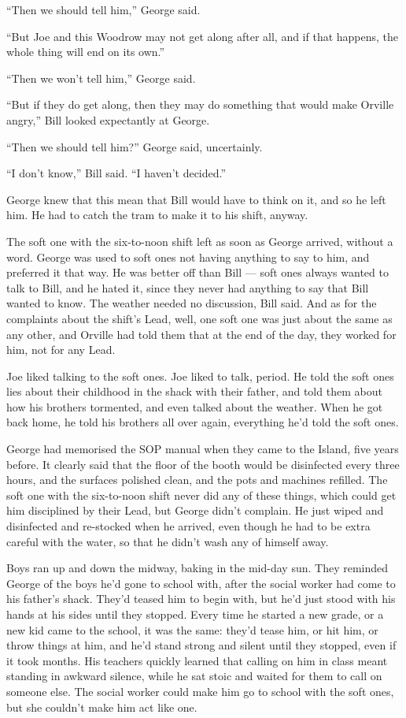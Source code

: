 ``Then we should tell him,'' George said.

``But Joe and this Woodrow may not get along after all, and if that happens, 
the whole thing will end on its own.''

``Then we won't tell him,'' George said.

``But if they do get along, then they may do something that would make Orville 
angry,''
Bill looked expectantly at George.

``Then we should tell him?'' George said, uncertainly.

``I don't know,'' Bill said. ``I haven't decided.''

George knew that this mean that Bill would have to think on it, and
so he left him. He had to catch the tram to make it to his shift,
anyway.

\tb

The soft one with the six-to-noon shift left as soon as George
arrived, without a word. George was used to soft ones not having
anything to say to him, and preferred it that way. He was better
off than Bill --- soft ones always wanted to talk to Bill, and he
hated it, since they never had anything to say that Bill wanted to
know. The weather needed no discussion, Bill said. And as for the
complaints about the shift's Lead, well, one soft one was just
about the same as any other, and Orville had told them that at the
end of the day, they worked for him, not for any Lead.

Joe liked talking to the soft ones. Joe liked to talk, period. He
told the soft ones lies about their childhood in the shack with
their father, and told them about how his brothers tormented, and
even talked about the weather. When he got back home, he told his
brothers all over again, everything he'd told the soft ones.

George had memorised the SOP manual when they came to the Island,
five years before. It clearly said that the floor of the booth
would be disinfected every three hours, and the surfaces polished
clean, and the pots and machines refilled. The soft one with the
six-to-noon shift never did any of these things, which could get
him disciplined by their Lead, but George didn't complain. He just
wiped and disinfected and re-stocked when he arrived, even though
he had to be extra careful with the water, so that he didn't wash
any of himself away.

Boys ran up and down the midway, baking in the mid-day sun. They
reminded George of the boys he'd gone to school with, after the
social worker had come to his father's shack. They'd teased him to
begin with, but he'd just stood with his hands at his sides until
they stopped. Every time he started a new grade, or a new kid came
to the school, it was the same: they'd tease him, or hit him, or
throw things at him, and he'd stand strong and silent until they
stopped, even if it took months. His teachers quickly learned that
calling on him in class meant standing in awkward silence, while he
sat stoic and waited for them to call on someone else. The social
worker could make him go to school with the soft ones, but she
couldn't make him act like one.


